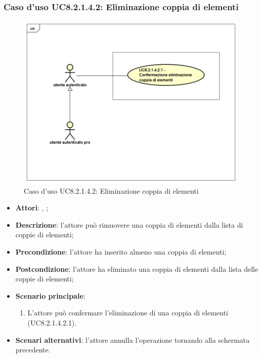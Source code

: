 	\subsubsection{Caso d'uso UC8.2.1.4.2: Eliminazione coppia di elementi}
	\label{UC8.2.1.4.2}
	\begin{figure}[h]
		\centering
		\includegraphics[scale=0.5,keepaspectratio]{UML/UC8_2_1_4_2.png}
		\caption{Caso d'uso UC8.2.1.4.2: Eliminazione coppia di elementi}
	\end{figure}
	\FloatBarrier
	\begin{itemize}
		\item \textbf{Attori}: \uau, \uaupro;
		\item \textbf{Descrizione}: l'attore può rimuovere una coppia di elementi dalla lista di coppie di elementi;
		\item \textbf{Precondizione}: l'attore ha inserito almeno una coppia di elementi;
		\item \textbf{Postcondizione}: l'attore ha eliminato una coppia di elementi dalla lista delle coppie di elementi;
		\item \textbf{Scenario principale}: 
		\begin{enumerate}
		\item L'attore può confermare l'eliminazione di una coppia di elementi (UC8.2.1.4.2.1).
		\end{enumerate}	
		\item \textbf{Scenari alternativi}: l'attore annulla l'operazione tornando alla schermata precedente.
	\end{itemize}

